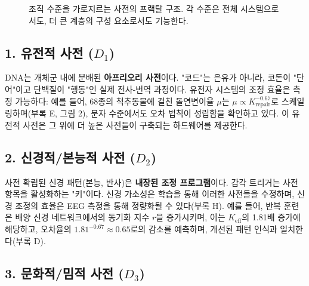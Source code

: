 \documentclass[12pt,a4paper]{article}
\newcommand{\eff}{\mathrm{eff}}
\newcommand{\Ke}{K_{\eff}}
\begin{document}
	\begin{figure}[htbp]
		\centering
		\caption{조직 수준을 가로지르는 사전의 프랙탈 구조. 각 수준은 전체 시스템으로서도, 더 큰 계층의 구성 요소로서도 기능한다.}
		\label{fig:fractal_dict}
	\end{figure}
	
	\subsection{1. 유전적 사전 (\(D_1\))}
	
	DNA는 개체군 내에 분배된 \textbf{아프리오리 사전}이다. "코드"는 은유가 아니라, 코돈이 "단어"이고 단백질이 "행동"인 실제 전사-번역 과정이다. 유전자 시스템의 조정 효율은 측정 가능하다: 예를 들어, 68종의 척추동물에 걸친 돌연변이율 \(\mu\)는 \(\mu \propto K_{\text{repair}}^{-0.67}\)로 스케일링하며(부록 E, 그림 2), 분자 수준에서도 오차 법칙이 성립함을 확인하고 있다. 이 유전적 사전은 그 위에 더 높은 사전들이 구축되는 하드웨어를 제공한다.
	
	\subsection{2. 신경적/본능적 사전 (\(D_2\))}
	
	사전 확립된 신경 패턴(본능, 반사)은 \textbf{내장된 조정 프로그램}이다. 감각 트리거는 사전 항목을 활성화하는 "키"이다. 신경 가소성은 학습을 통해 이러한 사전들을 수정하며, 신경 조정의 효율은 EEG 측정을 통해 정량화될 수 있다(부록 H). 예를 들어, 반복 훈련은 배양 신경 네트워크에서의 동기화 지수 \(r\)을 증가시키며, 이는 \(\Ke\)의 1.81배 증가에 해당하고, 오차율의 \(1.81^{-0.67} \approx 0.65\)로의 감소를 예측하며, 개선된 패턴 인식과 일치한다(부록 D).
	
	\subsection{3. 문화적/밈적 사전 (\(D_3\))}
	
\end{document}
